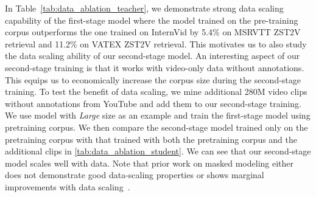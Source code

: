 \documentclass{article}
\theoremstyle{plain}
\theoremstyle{definition}
\theoremstyle{remark}
\begin{document}
In Table~\ref{tab:data_ablation_teacher}, we demonstrate strong data scaling capability of the first-stage model where the model trained on the pre-training corpus outperforms the one trained on InternVid \cite{wang2023internvid} by 5.4\% on MSRVTT ZST2V retrieval and 11.2\% on VATEX ZST2V retrieval.
This motivates us to also study the data scaling ability of our second-stage model.
An interesting aspect of our second-stage training is that it works with video-only data without annotations.
This equips us to economically increase the corpus size during the second-stage training.
To test the benefit of data scaling, we mine additional 280M video clips without annotations from YouTube and add them to our second-stage training.
We use model with \textit{Large} size as an example and train the first-stage model using pretraining corpus.
We then compare the second-stage model trained only on the pretraining corpus with that trained with both the pretraining corpus and the additional clips in \cref{tab:data_ablation_student}.
We can see that our second-stage model scales well with data.
Note that prior work on masked modeling either does not demonstrate good data-scaling properties or shows marginal improvements with data scaling~\cite{feichtenhofer2022masked, tong2022videomae}.






%
 
\end{document}
